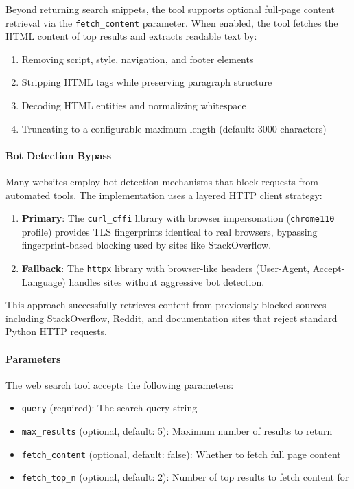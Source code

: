 Beyond returning search snippets, the tool supports optional full-page content retrieval via the \texttt{fetch\_content} parameter. When enabled, the tool fetches the HTML content of top results and extracts readable text by:
\begin{enumerate}
    \item Removing script, style, navigation, and footer elements
    \item Stripping HTML tags while preserving paragraph structure
    \item Decoding HTML entities and normalizing whitespace
    \item Truncating to a configurable maximum length (default: 3000 characters)
\end{enumerate}

\paragraph{Bot Detection Bypass}

Many websites employ bot detection mechanisms that block requests from automated tools. The implementation uses a layered HTTP client strategy:
\begin{enumerate}
    \item \textbf{Primary}: The \texttt{curl\_cffi} library with browser impersonation (\texttt{chrome110} profile) provides TLS fingerprints identical to real browsers, bypassing fingerprint-based blocking used by sites like StackOverflow.
    \item \textbf{Fallback}: The \texttt{httpx} library with browser-like headers (User-Agent, Accept-Language) handles sites without aggressive bot detection.
\end{enumerate}

This approach successfully retrieves content from previously-blocked sources including StackOverflow, Reddit, and documentation sites that reject standard Python HTTP requests.

\paragraph{Parameters}

The web search tool accepts the following parameters:
\begin{itemize}
    \item \texttt{query} (required): The search query string
    \item \texttt{max\_results} (optional, default: 5): Maximum number of results to return
    \item \texttt{fetch\_content} (optional, default: false): Whether to fetch full page content
    \item \texttt{fetch\_top\_n} (optional, default: 2): Number of top results to fetch content for
\end{itemize}

